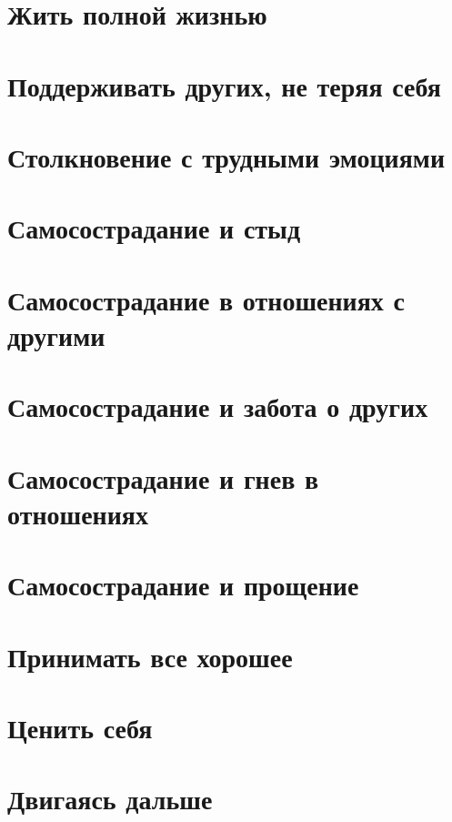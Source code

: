 \documentclass[a4paper,12pt]{article}
\begin{document}
\section{Жить полной жизнью}
\section{Поддерживать других, не теряя себя}
\section{Столкновение с трудными эмоциями}
\section{Самосострадание и стыд}
\section{Самосострадание в отношениях с другими}
\section{Самосострадание и забота о других}
\section{Самосострадание и гнев в отношениях}
\section{Самосострадание и прощение}
\section{Принимать все хорошее}
\section{Ценить себя}
\section{Двигаясь дальше}
\end{document}
